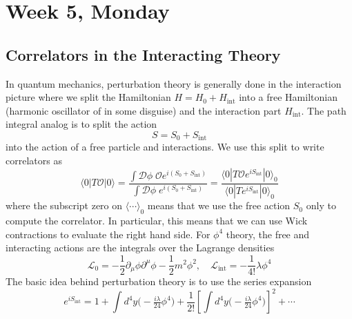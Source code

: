 
\section{Week 5, Monday}


\subsection{Correlators in the Interacting Theory}

In quantum mechanics, perturbation theory is generally done in the
interaction picture where we split the Hamiltonian $H=H_0 +
H_\text{int}$ into a free Hamiltonian (harmonic oscillator of in some
disguise) and the interaction part $H_\text{int}$. The path integral
analog is to split the action
\begin{equation}
  S = S_0 + S_\text{int}
\end{equation}
into the action of a free particle and interactions. We use this split
to write correlators as
\begin{equation}
  \label{eq:corrSint}
  \langle 0 | T\mathcal{O} |0\rangle =
  \frac{
    \int \mathcal{D}\phi \; \mathcal{O} e^{i(S_0+S_\text{int})}
  }{ 
    \int \mathcal{D}\phi \; e^{i(S_0+S_\text{int})}
  }
  = 
  \frac{
    \langle0|T \mathcal{O} e^{iS_\text{int}} |0\rangle_0
  }{
    \langle0|T e^{iS_\text{int}} |0\rangle_0
  }
\end{equation}
where the subscript zero on $\langle \cdots \rangle_0$ means that we
use the free action $S_0$ only to compute the correlator. In
particular, this means that we can use Wick contractions to evaluate
the right hand side. For $\phi^4$ theory, the free and interacting
actions are the integrals over the Lagrange densities
\begin{equation}
  \mathcal{L}_0 = -\frac{1}{2} \partial_\mu \phi \partial^\mu \phi
  - \frac{1}{2} m^2 \phi^2
  , \quad
  \mathcal{L}_\text{int} = 
  - \frac{1}{4!} \lambda \phi^4
\end{equation}
The basic idea behind perturbation theory is to use the series
expansion
\begin{equation}
  e^{i S_\text{int}} = 
  1 + 
  \int d^4y \big(-\tfrac{i\lambda}{24} \phi^4 \big) + 
  \frac{1}{2!}
  \left[\int d^4y \big(-\tfrac{i\lambda}{24} \phi^4 \big)\right]^2
  + \cdots
\end{equation}
